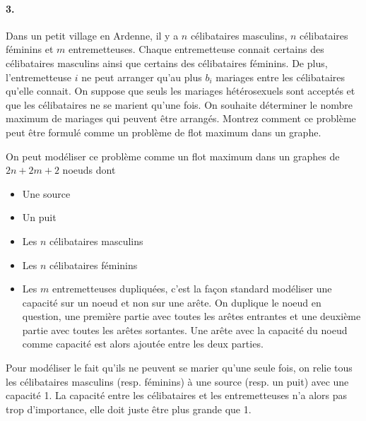 \paragraph{3. } Dans un petit village en Ardenne, il y a $n$ célibataires masculins, $n$ célibataires féminins et $m$ entremetteuses. Chaque entremetteuse connait certains des célibataires masculins ainsi que certains des célibataires féminins. De plus, l'entremetteuse $i$ ne peut arranger qu'au plus $b_i$ mariages entre les célibataires qu'elle connait. On suppose que seuls les mariages hétérosexuels sont acceptés et que les célibataires ne se marient qu'une fois. On souhaite déterminer le nombre maximum de mariages qui peuvent être arrangés. Montrez comment ce problème peut être formulé comme un problème de flot maximum dans un graphe. 

\begin{solution}
  On peut modéliser ce problème comme un flot maximum dans un graphes de $2n + 2m + 2$ noeuds dont
  \begin{itemize}
    \item Une source
    \item Un puit
    \item Les $n$ célibataires masculins
    \item Les $n$ célibataires féminins
    \item Les $m$ entremetteuses dupliquées,
      c'est la façon standard modéliser une capacité sur un noeud et non sur une arête.
      On duplique le noeud en question, une première partie avec toutes les arêtes entrantes
      et une deuxième partie avec toutes les arêtes sortantes.
      Une arête avec la capacité du noeud comme capacité est alors ajoutée entre les deux parties.
  \end{itemize}
  Pour modéliser le fait qu'ils ne peuvent se marier qu'une seule fois, on relie tous les célibataires
  masculins (resp. féminins) à une source (resp. un puit) avec une capacité 1.
  La capacité entre les célibataires et les entremetteuses n'a alors pas trop d'importance,
  elle doit juste être plus grande que 1.


\end{solution}
